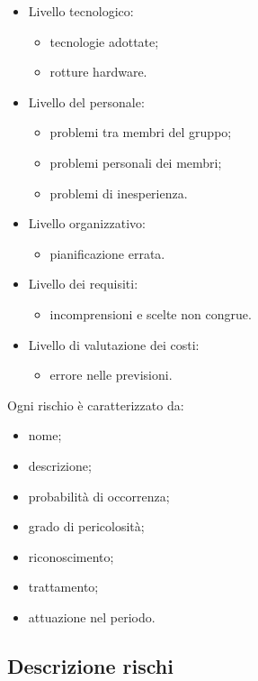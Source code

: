 \begin{itemize}
	\item Livello tecnologico:
	\begin{itemize}
		\item tecnologie adottate;
		\item rotture hardware.
	\end{itemize}
	\item Livello del personale:
	\begin{itemize}
		\item problemi tra membri del gruppo;
		\item problemi personali dei membri;
		\item problemi di inesperienza.
	\end{itemize}
	\item Livello organizzativo:
	\begin{itemize}
		\item pianificazione errata.
	\end{itemize}
	\item Livello dei requisiti:
	\begin{itemize}
		\item incomprensioni e scelte non congrue.
	\end{itemize}
	\item Livello di valutazione dei costi:
	\begin{itemize}
		\item errore nelle previsioni.
	\end{itemize}
\end{itemize}
Ogni rischio è caratterizzato da:
\begin{itemize}
	\item nome;
	\item descrizione;
	\item probabilità di occorrenza;
	\item grado di pericolosità;
	\item riconoscimento;
	\item trattamento;
	\item attuazione nel periodo.
\end{itemize}

\subsection{Descrizione rischi}

